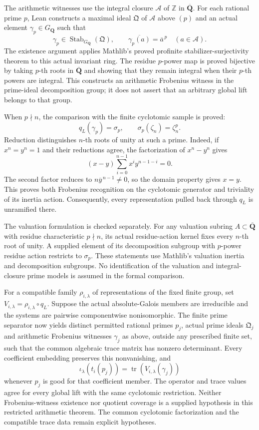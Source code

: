\documentclass[11pt]{article}
\theoremstyle{definition}
\theoremstyle{remark}
\newcommand{\Q}{\mathbf Q}
\begin{document}
The arithmetic witnesses use the integral closure
$\mathcal A$ of $\mathbb Z$ in $\overline{\Q}$. For each rational prime $p$,
Lean constructs a maximal ideal $\mathfrak Q$ of $\mathcal A$ above $(p)$ and
an actual element $\gamma_p\in G_{\Q}$ such that
\[
 \gamma_p\in\operatorname{Stab}_{G_{\Q}}(\mathfrak Q),\qquad
 \overline{\gamma_p(a)}=\overline a^{\,p}
 \quad(a\in\mathcal A).
\]
The existence argument applies Mathlib's proved profinite stabilizer-surjectivity
theorem to this actual invariant ring. The residue $p$-power map is proved
bijective by taking $p$-th roots in $\overline{\Q}$ and showing that they
remain integral when their $p$-th powers are integral. This constructs an
arithmetic Frobenius witness in the prime-ideal decomposition group; it does
not assert that an arbitrary global lift belongs to that group.

When $p\nmid n$, the comparison with the finite cyclotomic sample is proved:
\[
 q_L(\gamma_p)=\sigma_p,
 \qquad \sigma_p(\zeta_n)=\zeta_n^p.
\]
Reduction distinguishes $n$-th roots of unity at such a prime. Indeed, if
$x^n=y^n=1$ and their reductions agree, the factorization of $x^n-y^n$ gives
\[
 (x-y)\sum_{i=0}^{n-1}x^i y^{n-1-i}=0.
\]
The second factor reduces to $n\overline y^{\,n-1}\ne0$, so the domain
property gives $x=y$. This proves both Frobenius recognition on the
cyclotomic generator and triviality of its inertia action. Consequently,
every representation pulled back through $q_L$ is unramified there.

The valuation formulation is checked separately. For any valuation subring
$A\subset\overline{\Q}$ with residue characteristic $p\nmid n$, its actual
residue-action kernel fixes every $n$-th root of unity. A supplied element of
its decomposition subgroup with $p$-power residue action restricts to
$\sigma_p$. These statements use Mathlib's valuation inertia and decomposition
subgroups. No identification of the valuation and integral-closure prime
models is assumed in the formal comparison.

For a compatible family $\rho_{i,\lambda}$ of representations of the fixed
finite group, set $V_{i,\lambda}=\rho_{i,\lambda}\circ q_L$. Suppose the
actual absolute-Galois members are irreducible and the systems are pairwise
componentwise nonisomorphic. The finite prime separator now yields distinct
permitted rational primes $p_j$, actual prime ideals $\mathfrak Q_j$ and
arithmetic Frobenius witnesses $\gamma_j$ as above, outside any prescribed
finite set, such that the common algebraic trace matrix has nonzero
determinant. Every coefficient embedding preserves this nonvanishing, and
\[
 \iota_\lambda(t_i(p_j))=
 \operatorname{tr}(V_{i,\lambda}(\gamma_j))
\]
whenever $p_j$ is good for that coefficient member. The operator and trace
values agree for every global lift with the same cyclotomic restriction.
Neither Frobenius-witness existence nor quotient coverage is a supplied
hypothesis in this restricted arithmetic theorem. The common cyclotomic
factorization and the compatible trace data remain explicit hypotheses.
\end{document}
